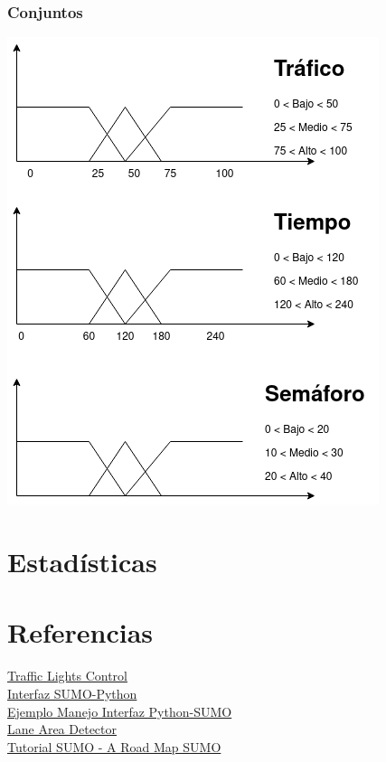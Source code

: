 \documentclass{article}
\begin{document}
\subsubsection{Conjuntos}
\includegraphics[scale=0.6]{logica_difusa.png}


\newpage
\section{Estadísticas}


\section{Referencias}

\href{https://sumo.dlr.de/docs/Simulation/Traffic_Lights.html}{Traffic Lights Control}\\
\href{https://pypi.org/project/traci/}{Interfaz SUMO-Python}\\
\href{https://github.com/ethanpng2021/sumo-example/blob/main/2021-05-01-22-25-37/sumo_run.py}{Ejemplo Manejo Interfaz Python-SUMO}\\
\href{https://sumo.dlr.de/docs/TraCI/Lane_Area_Detector_Value_Retrieval.html}{Lane Area Detector}\\
\href{https://cst.fee.unicamp.br/sites/default/files/sumo/sumo-roadmap.pdf}{Tutorial SUMO - A Road Map SUMO}
\end{document}
